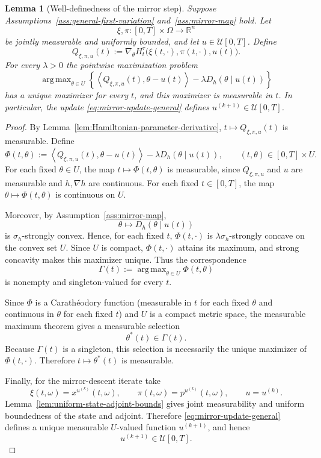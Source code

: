\documentclass[11pt]{amsart}
\numberwithin{equation}{section} %
\DeclareMathOperator*{\argmax}{arg\,max}
\newtheorem{lemma}{Lemma}[section]
\theoremstyle{remark}
\begin{document}
\begin{lemma}[Well-definedness of the mirror step]
\label{lem:mirror-step-measurability}
Suppose Assumptions~\ref{ass:general-first-variation}
and~\ref{ass:mirror-map} hold. Let
\[
\xi,\pi:[0,T]\times\Omega\to\mathbb R^n
\]
be jointly measurable and uniformly bounded, and let
$u\in\mathcal U[0,T]$. Define
\begin{equation}
\label{eq:measurable-Hamiltonian-gradient}
Q_{\xi,\pi,u}(t)
:=
\nabla_\theta H_t^\tau
\bigl(\xi(t,\cdot),\pi(t,\cdot),u(t)\bigr).
\end{equation}
For every
$\lambda>0$ the pointwise maximization problem
\begin{equation}
\label{eq:generic-mirror-maximization}
\argmax_{\theta\in U}
\left\{
\left\langle
Q_{\xi,\pi,u}(t),\theta-u(t)
\right\rangle
-\lambda D_h(\theta\mid u(t))
\right\}
\end{equation}
has a unique maximizer for every $t$, and this maximizer is measurable
in $t$. In particular, the update
\eqref{eq:mirror-update-general} defines
$u^{(k+1)}\in\mathcal U[0,T]$.
\end{lemma}

\begin{proof}
By Lemma~\ref{lem:Hamiltonian-parameter-derivative},
$t\mapsto Q_{\xi,\pi,u}(t)$ is measurable. Define
\[
\Phi(t,\theta)
:=
\left\langle
Q_{\xi,\pi,u}(t),\theta-u(t)
\right\rangle
-
\lambda D_h(\theta\mid u(t)),
\qquad
(t,\theta)\in[0,T]\times U.
\]
For each fixed $\theta\in U$, the map
$t\mapsto\Phi(t,\theta)$ is measurable, since
$Q_{\xi,\pi,u}$ and $u$ are measurable and $h,\nabla h$ are
continuous. For each fixed $t\in[0,T]$, the map
$\theta\mapsto\Phi(t,\theta)$ is continuous on $U$.

Moreover, by Assumption~\ref{ass:mirror-map},
\[
\theta\longmapsto D_h(\theta\mid u(t))
\]
is $\sigma_h$-strongly convex. Hence, for each fixed $t$,
$\Phi(t,\cdot)$ is $\lambda\sigma_h$-strongly concave on the convex
set $U$. Since $U$ is compact, $\Phi(t,\cdot)$ attains its maximum,
and strong concavity makes this maximizer unique. Thus the
correspondence
\[
\Gamma(t)
:=
\argmax_{\theta\in U}\Phi(t,\theta)
\]
is nonempty and singleton-valued for every $t$.

Since $\Phi$ is a Carath\'eodory function (measurable in $t$ for each fixed $\theta$ and continuous in $\theta$ for each fixed $t$) and $U$ is a compact metric space, the measurable maximum theorem gives a measurable selection
\[
\theta^*(t)\in\Gamma(t).
\]
Because $\Gamma(t)$ is a singleton, this selection is necessarily
the unique maximizer of $\Phi(t,\cdot)$. Therefore
$t\mapsto\theta^*(t)$ is measurable.

Finally, for the mirror-descent iterate take
\[
\xi(t,\omega)=x^{u^{(k)}}(t,\omega),
\qquad
\pi(t,\omega)=p^{u^{(k)}}(t,\omega),
\qquad
u=u^{(k)}.
\]
Lemma~\ref{lem:uniform-state-adjoint-bounds} gives joint measurability and uniform boundedness of the state and adjoint. Therefore \eqref{eq:mirror-update-general} defines a unique measurable $U$-valued function $u^{(k+1)}$, and hence
\[
u^{(k+1)}\in\mathcal U[0,T].
\]
\end{proof}
\end{document}
